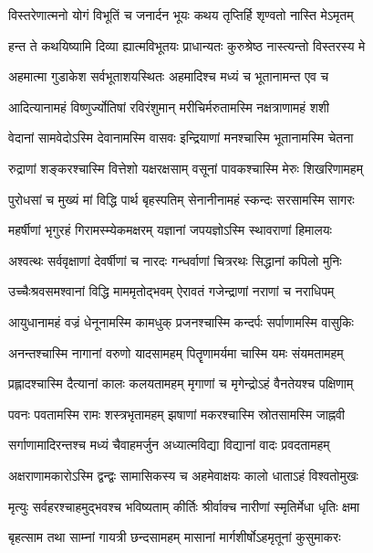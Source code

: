 \twolineshloka
{विस्तरेणात्मनो योगं विभूतिं च जनार्दन}
{भूयः कथय तृप्तिर्हि शृण्वतो नास्ति मेऽमृतम्}%

\twolineshloka
{हन्त ते कथयिष्यामि दिव्या ह्यात्मविभूतयः}
{प्राधान्यतः कुरुश्रेष्ठ नास्त्यन्तो विस्तरस्य मे}%

\twolineshloka
{अहमात्मा गुडाकेश सर्वभूताशयस्थितः}
{अहमादिश्च मध्यं च भूतानामन्त एव च}%

\twolineshloka
{आदित्यानामहं विष्णुर्ज्योतिषां रविरंशुमान्}
{मरीचिर्मरुतामस्मि नक्षत्राणामहं शशी}%

\twolineshloka
{वेदानां सामवेदोऽस्मि देवानामस्मि वासवः}
{इन्द्रियाणां मनश्चास्मि भूतानामस्मि चेतना}%

\twolineshloka
{रुद्राणां शङ्करश्चास्मि वित्तेशो यक्षरक्षसाम्}
{वसूनां पावकश्चास्मि मेरुः शिखरिणामहम्}%

\twolineshloka
{पुरोधसां च मुख्यं मां विद्धि पार्थ बृहस्पतिम्}
{सेनानीनामहं स्कन्दः सरसामस्मि सागरः}%

\twolineshloka
{महर्षीणां भृगुरहं गिरामस्म्येकमक्षरम्}
{यज्ञानां जपयज्ञोऽस्मि स्थावराणां हिमालयः}%

\twolineshloka
{अश्वत्थः सर्ववृक्षाणां देवर्षीणां च नारदः}
{गन्धर्वाणां चित्ररथः सिद्धानां कपिलो मुनिः}%

\twolineshloka
{उच्चैःश्रवसमश्वानां विद्धि माममृतोद्भवम्}
{ऐरावतं गजेन्द्राणां नराणां च नराधिपम्}%

\twolineshloka
{आयुधानामहं वज्रं धेनूनामस्मि कामधुक्}
{प्रजनश्चास्मि कन्दर्पः सर्पाणामस्मि वासुकिः}%

\twolineshloka
{अनन्तश्चास्मि नागानां वरुणो यादसामहम्}
{पितॄणामर्यमा चास्मि यमः संयमतामहम्}%

\twolineshloka
{प्रह्लादश्चास्मि दैत्यानां कालः कलयतामहम्}
{मृगाणां च मृगेन्द्रोऽहं वैनतेयश्च पक्षिणाम्}%

\twolineshloka
{पवनः पवतामस्मि रामः शस्त्रभृतामहम्}
{झषाणां मकरश्चास्मि स्रोतसामस्मि जाह्नवी}%

\twolineshloka
{सर्गाणामादिरन्तश्च मध्यं चैवाहमर्जुन}
{अध्यात्मविद्या विद्यानां वादः प्रवदतामहम्}%

\twolineshloka
{अक्षराणामकारोऽस्मि द्वन्द्वः सामासिकस्य च}
{अहमेवाक्षयः कालो धाताऽहं विश्वतोमुखः}%

\twolineshloka
{मृत्युः सर्वहरश्चाहमुद्भवश्च भविष्यताम्}
{कीर्तिः श्रीर्वाक्च नारीणां स्मृतिर्मेधा धृतिः क्षमा}
{}%

\twolineshloka
{बृहत्साम तथा साम्नां गायत्री छन्दसामहम्}
{मासानां मार्गशीर्षोऽहमृतूनां कुसुमाकरः}%

